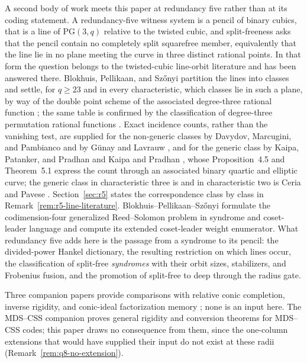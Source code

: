 A second body of work meets this paper at redundancy five rather than
at its coding statement.  A redundancy-five witness system is a pencil
of binary cubics, that is a line of \(\mathrm{PG}(3,q)\) relative to the
twisted cubic, and split-freeness asks that the pencil contain no
completely split squarefree member, equivalently that the line lie in
no plane meeting the curve in three distinct rational points.  In that
form the question belongs to the twisted-cubic line-orbit literature
and has been answered there.  Blokhuis, Pellikaan, and Sz\H onyi
partition the lines into classes and settle, for \(q\geq23\) and in
every characteristic, which classes lie in such a plane, by way of the
double point scheme of the associated degree-three rational function
\cite[Thm.~8.1, Prop.~8.4 and Rem.~7.12]{BPS2022}; the same table is
confirmed by the classification of degree-three permutation rational
functions \cite{FerragutiMicheli2020}.  Exact incidence counts, rather
than the vanishing test, are supplied for the non-generic classes by
Davydov, Marcugini, and Pambianco \cite{DMP2021,DMP2022,DMP2023} and by
G\"unay and Lavrauw \cite{GunayLavrauw2022}, and for the generic class
by Kaipa, Patanker, and Pradhan \cite{KPP2025} and Kaipa and Pradhan
\cite{KaipaPradhan2025}, whose Proposition~4.5 and Theorem~5.1 express the count through
an associated binary quartic and elliptic curve; the generic class in
characteristic three is \cite{KaipaPradhan2025char3} and in
characteristic two is Ceria and Pavese \cite{CeriaPavese2023}.
Section~\ref{sec:r5} states the correspondence class by class in
Remark~\ref{rem:r5-line-literature}.  Blokhuis--Pellikaan--Sz\H onyi
formulate the codimension-four generalized Reed--Solomon problem in
syndrome and coset-leader language and compute its extended coset-leader
weight enumerator.  What redundancy five adds here is the passage from a
syndrome to its pencil: the divided-power Hankel dictionary, the
resulting restriction on which lines occur, the classification of
split-free \emph{syndromes} with their orbit sizes, stabilizers, and
Frobenius fusion, and the promotion of split-free to deep through the
radius gate.

Three companion papers provide comparisons with relative conic completion,
inverse rigidity, and conic-ideal factorization memory
\cite{RuddPrescribedHoles2026,RuddRigidity2026,RuddFactorization2026};
none is an input here.  The MDS--CSS companion \cite{RuddAMELU2026}
proves general rigidity and conversion theorems for MDS--CSS codes; this
paper draws no consequence from them, since the one-column extensions
that would have supplied their input do not exist at these radii
(Remark~\ref{rem:q8-no-extension}).

